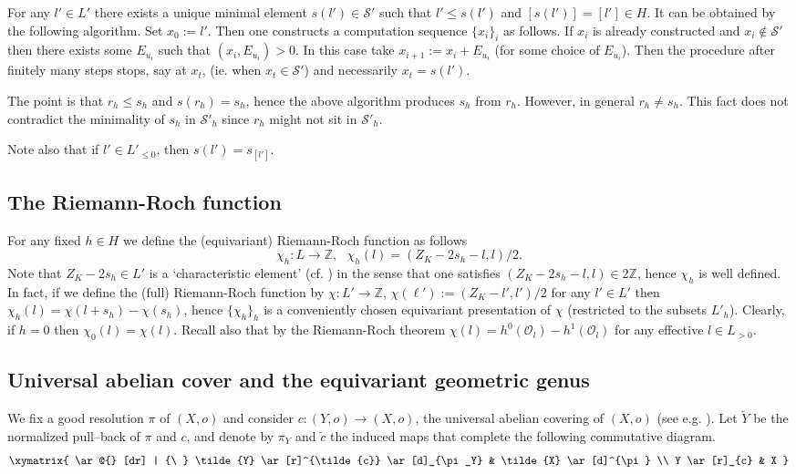 \documentclass[12pt,a4paper]{amsart}
\def\cS{{\mathcal S}}
\def\ZZ{\mathbb{Z}}
\theoremstyle{remark}
\theoremstyle{definition}
\begin{document}
For any $l'\in L'$ there exists a unique
minimal element $s(l')\in \cS'$  such that $l'\leq s(l')$ and $[s(l')]=[l']\in H$. It  can be obtained by the following algorithm. Set $x_0:=l'$. Then one constructs  a computation sequence $\{x_i\}_i$ as follows. If $x_i$ is already constructed and $x_i\not\in\cS'$ then there exists some $E_{u_i}$ such that $(x_i,E_{u_i})>0$. In this case take $x_{i+1}:=x_i+E_{u_i}$ (for some choice of $E_{u_i}$). Then the procedure after finitely many steps stops, say at $x_t$, (ie. when 
$x_t\in \cS'$) and necessarily $x_t=s(l')$.

The point is  that $r_h\leq s_h$ and $s(r_h)=s_h$, hence the above algorithm produces $s_h$ from
$r_h$. However, in general $r_h\neq s_h$.
This fact does not contradict the minimality of $s_h$ in $\cS'_h$ since $r_h$ might not sit in $\cS'_h$.

Note also that  if $l'\in L'_{\leq 0}$, then $s(l')=s_{[l']}$. 

\subsection{The Riemann-Roch function}
For any fixed $h\in H$ we define the (equivariant) Riemann-Roch function as follows
\begin{equation}\label{eq:RR}
\chi_h:L\to \mathbb{Z}, \ \ \ \chi_h(l)=(Z_K-2s_h-l, l)/2.
\end{equation}
Note that $Z_K-2s_h\in L'$ is a `characteristic element' (cf. \cite[6.3.7]{nbook}) in the sense that one satisfies $(Z_K-2s_h-l,l)\in 2\ZZ$, hence $\chi_h$ is well defined. In fact, if we define the (full) Riemann-Roch function by $\chi:L'\to \ZZ$, $\chi(\ell'):=(Z_K-l',l')/2$ for any $l'\in L'$ then $\chi_h(l)=\chi(l+s_h)-\chi(s_h)$, hence $\{\chi_h\}_h$ is a conveniently chosen equivariant presentation of $\chi$ (restricted to the subsets $L'_h$). Clearly, if $h=0$ then $\chi_0(l)=\chi(l)$.
Recall also that  by the Riemann-Roch theorem
 $\chi(l)=h^0({\mathcal O}_l)-h^1({\mathcal O}_l)$
 for any effective $l\in L_{>0}$. 

\subsection{Universal abelian cover and the equivariant geometric genus}
\label{ss:uac}
We fix a good resolution $\pi$ of $(X,o)$ and consider $c:(Y,o)\to (X,o)$, the universal abelian covering of $(X,o)$ (see e.g. \cite[6.2.5]{nbook}). Let $\tilde Y$ be the normalized pull--back of $\pi$ and $c$, and denote by $\pi_Y$ and $\tilde{c}$
the induced maps that complete the following commutative diagram.
\begin{equation}
\label{eq:diagram}
\xymatrix{
\ar @{} [dr] | {\ }
\tilde{Y} \ar[r]^{\tilde{c}} \ar[d]_{\pi_Y} & \tilde{X} \ar[d]^{\pi} \\
Y \ar[r]_{c} & X
}
\end{equation}
\end{document}

